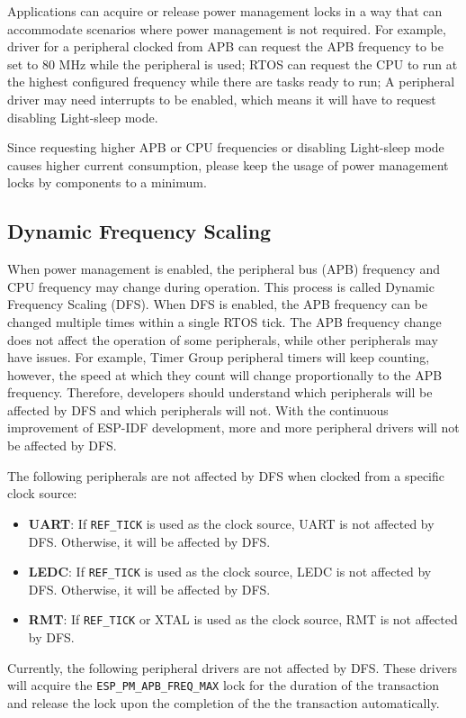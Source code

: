 \documentclass[a4paper,12pt]{book}
\begin{document}
Applications can acquire or release power management locks in a way that can accommodate scenarios where power management is not required. For example, driver for a peripheral clocked from APB can request the APB frequency to be set to 80 MHz while the peripheral is used; RTOS can request the CPU to run at the highest configured frequency while there are tasks ready to run; A peripheral driver may need interrupts to be enabled, which means it will have to request disabling Light-sleep mode.

Since requesting higher APB or CPU frequencies or disabling Light-sleep mode causes higher current consumption, please keep the usage of power management locks by components to a minimum.

\subsection{Dynamic Frequency Scaling}
When power management is enabled, the peripheral bus (APB) frequency and CPU frequency may change during operation. This process is called Dynamic Frequency Scaling (DFS). When DFS is enabled, the APB frequency can be changed multiple times within a single RTOS tick. The APB frequency change does not affect the operation of some peripherals, while other peripherals may have issues. For example, Timer Group peripheral timers will keep counting, however, the speed at which they count will change proportionally to the APB frequency. Therefore, developers should understand which peripherals will be affected by DFS and which peripherals will not. With the continuous improvement of ESP-IDF development, more and more peripheral drivers will not be affected by DFS.

The following peripherals are not affected by DFS when clocked from a specific clock source:

\begin{itemize}
    \item \textbf{UART}: If \verb|REF_TICK| is used as the clock source, UART is not affected by DFS. Otherwise, it will be affected by DFS.
    \item \textbf{LEDC}: If \verb|REF_TICK| is used as the clock source, LEDC is not affected by DFS. Otherwise, it will be affected by DFS.
    \item \textbf{RMT}: If \verb|REF_TICK| or XTAL is used as the clock source, RMT is not affected by DFS.
\end{itemize}

Currently, the following peripheral drivers are not affected by DFS. These drivers will acquire the \verb|ESP_PM_APB_FREQ_MAX| lock for the duration of the transaction and release the lock upon the completion of the the transaction automatically.
\end{document}
